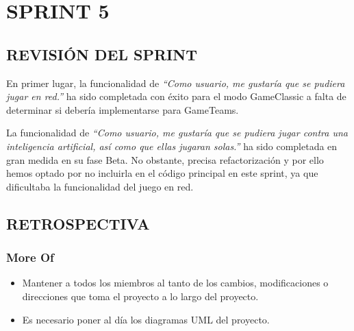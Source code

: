 \documentclass[../../SCRUM.tex]{subfiles}
\begin{document}
\section{SPRINT 5}
\subsection{REVISIÓN DEL SPRINT}
En primer lugar, la funcionalidad de \textit{``Como usuario, me gustaría
que se pudiera jugar en red.''} ha sido completada con éxito para el
modo GameClassic a falta de determinar si debería implementarse para
GameTeams.

La funcionalidad de \textit{``Como usuario, me gustaría que se pudiera
jugar contra una inteligencia artificial, así como que ellas jugaran
solas.''} ha sido completada en gran medida en su fase Beta. No
obstante, precisa refactorización y por ello hemos optado por no
incluirla en el código principal en este sprint, ya que dificultaba la
funcionalidad del juego en red.

\subsection{RETROSPECTIVA}

\subsubsection{More Of}
\begin{itemize}
\item
  Mantener a todos los miembros al tanto de los cambios, modificaciones
  o direcciones que toma el proyecto a lo largo del proyecto.
\item
  Es necesario poner al día los diagramas UML del proyecto.
\end{itemize}
\end{document}
